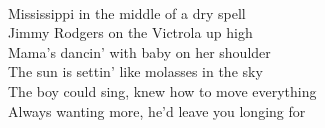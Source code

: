 \\
Mississippi in the middle of a dry spell \\
	Jimmy Rodgers on the Victrola up high \\
	Mama's dancin' with baby on her shoulder \\
	The sun is settin' like molasses in the sky \\
	The boy could sing, knew how to move everything \\
	Always wanting more, he'd leave you longing for \\

